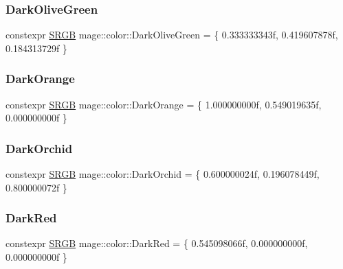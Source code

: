 \subsubsection{\texorpdfstring{Dark\+Olive\+Green}{DarkOliveGreen}}
{\footnotesize\ttfamily constexpr \hyperlink{structmage_1_1_s_r_g_b}{S\+R\+GB} mage\+::color\+::\+Dark\+Olive\+Green = \{ 0.\+333333343f, 0.\+419607878f, 0.\+184313729f \}}

\hypertarget{namespacemage_1_1color_a53a4dc6b5218c497badc8e1438611f9f}{}\label{namespacemage_1_1color_a53a4dc6b5218c497badc8e1438611f9f} 
\subsubsection{\texorpdfstring{Dark\+Orange}{DarkOrange}}
{\footnotesize\ttfamily constexpr \hyperlink{structmage_1_1_s_r_g_b}{S\+R\+GB} mage\+::color\+::\+Dark\+Orange = \{ 1.\+000000000f, 0.\+549019635f, 0.\+000000000f \}}

\hypertarget{namespacemage_1_1color_af5db2e77f3bd7749137a5d2719fb6c14}{}\label{namespacemage_1_1color_af5db2e77f3bd7749137a5d2719fb6c14} 
\subsubsection{\texorpdfstring{Dark\+Orchid}{DarkOrchid}}
{\footnotesize\ttfamily constexpr \hyperlink{structmage_1_1_s_r_g_b}{S\+R\+GB} mage\+::color\+::\+Dark\+Orchid = \{ 0.\+600000024f, 0.\+196078449f, 0.\+800000072f \}}

\hypertarget{namespacemage_1_1color_a680b3f5e56d358e0a6cce06b1afc6497}{}\label{namespacemage_1_1color_a680b3f5e56d358e0a6cce06b1afc6497} 
\subsubsection{\texorpdfstring{Dark\+Red}{DarkRed}}
{\footnotesize\ttfamily constexpr \hyperlink{structmage_1_1_s_r_g_b}{S\+R\+GB} mage\+::color\+::\+Dark\+Red = \{ 0.\+545098066f, 0.\+000000000f, 0.\+000000000f \}}

\hypertarget{namespacemage_1_1color_ade533d6b3d878604daca90eb749a7d52}{}\label{namespacemage_1_1color_ade533d6b3d878604daca90eb749a7d52} 
